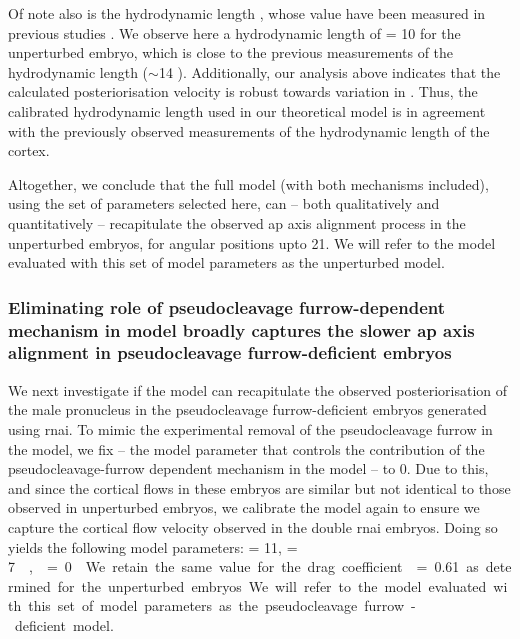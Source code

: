 Of note also is the hydrodynamic length \hydrodynamicLength, whose value have been measured in previous studies \citep{saha2016determining,mayer2010anisotropies}. We observe here a hydrodynamic length of \hydrodynamicLength = \SI{10}{\unitLength} for the unperturbed embryo, which is close to the previous measurements of the hydrodynamic length ($\sim$\SI{14}{\unitLength} \citep{saha2016determining,mayer2010anisotropies}). Additionally, our analysis above indicates that the calculated posteriorisation velocity is robust towards variation in \hydrodynamicLength. Thus, the calibrated hydrodynamic length used in our theoretical model is in agreement with the previously observed measurements of the hydrodynamic length of the cortex. 

Altogether, we conclude that the full model (with both mechanisms included), using the set of parameters selected here, can -- both qualitatively and quantitatively -- recapitulate the observed \ac{ap} axis alignment process in the unperturbed embryos, for angular positions upto \SI{21}{\unitAngle}. We will refer to the model evaluated with this set of model parameters as the unperturbed model.

\subsubsection{Eliminating role of pseudocleavage furrow-dependent mechanism in model broadly captures the slower \acs{ap} axis alignment in pseudocleavage furrow-deficient embryos}\label{subsubsec:cytoModelForNop1Mel11}
We next investigate if the model can recapitulate the observed posteriorisation of the male pronucleus in the pseudocleavage furrow-deficient embryos generated using  \ac{rnai}. To mimic the experimental removal of the pseudocleavage furrow in the model, we fix \nematicLength -- the model parameter that controls the contribution of the pseudocleavage-furrow dependent mechanism in the model -- to \num{0}. Due to this, and since the cortical flows in these embryos are similar but not identical to those observed in unperturbed embryos, we calibrate the model again to ensure we capture the cortical flow velocity observed in the double \ac{rnai} embryos. Doing so yields the following model parameters: \hydrodynamicLength = \SI{11}{\unitLength}, \activeRelaxLength = \SI{7}{\square\unitLength\per\second}, \nematicLength = \SI{0}{\square\unitLength\per\second}. We retain the same value for the drag coefficient \dragCoefficient = \num{0.61} as determined for the unperturbed embryos. We will refer to the model evaluated with this set of model parameters as the pseudocleavage furrow-deficient model.

